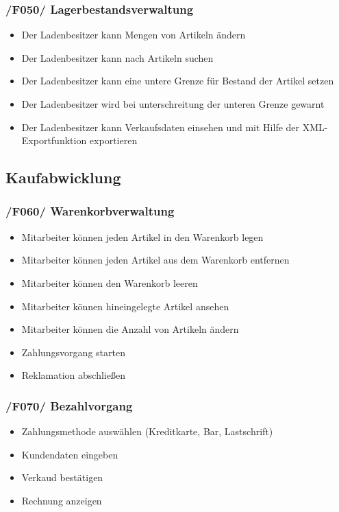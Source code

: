 \documentclass[pdftex,12pt,a4paper]{article}
\begin{document}
\subsubsection*{/F050/ Lagerbestandsverwaltung}
\begin{itemize}
\item Der Ladenbesitzer kann Mengen von Artikeln \"andern
\item Der Ladenbesitzer kann nach Artikeln suchen
\item Der Ladenbesitzer kann eine untere Grenze f\"ur Bestand der Artikel setzen
\item Der Ladenbesitzer wird bei unterschreitung der unteren Grenze gewarnt
\item Der Ladenbesitzer kann Verkaufsdaten einsehen und mit Hilfe der XML-Exportfunktion exportieren
\end{itemize}
\subsection*{Kaufabwicklung}
\subsubsection*{/F060/ Warenkorbverwaltung}
\begin{itemize}
\item Mitarbeiter k\"onnen jeden Artikel in den Warenkorb legen
\item Mitarbeiter k\"onnen jeden Artikel aus dem Warenkorb entfernen
\item Mitarbeiter k\"onnen den Warenkorb leeren
\item Mitarbeiter k\"onnen hineingelegte Artikel ansehen
\item Mitarbeiter k\"onnen die Anzahl von Artikeln \"andern
\item Zahlungsvorgang starten
\item Reklamation abschlie\ss{}en
\end{itemize}
\subsubsection*{/F070/ Bezahlvorgang}
\begin{itemize}
\item Zahlungsmethode ausw\"ahlen (Kreditkarte, Bar, Lastschrift)
\item Kundendaten eingeben
\item Verkaud best\"atigen
\item Rechnung anzeigen
\end{itemize}
\end{document}
